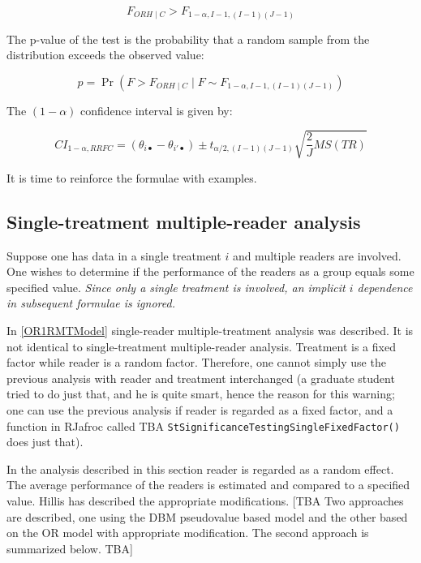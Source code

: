 \documentclass[
]{book}
\begin{document}
\[F_{ORH \mid C}>F_{1-\alpha,I-1,(I-1)(J-1)}\]

The p-value of the test is the probability that a random sample from the distribution exceeds the observed value:

\[p=\Pr(F>F_{ORH \mid C} \mid F \sim F_{1-\alpha,I-1,(I-1)(J-1)})\]

The \((1-\alpha)\) confidence interval is given by:

\begin{equation}
CI_{1-\alpha,RRFC}=(\theta_{i \bullet} - \theta_{i' \bullet}) \pm t_{\alpha/2, (I-1)(J-1)}\sqrt{\frac{2}{J}MS(TR)}
\label{eq:CIalphaRRFC}
\end{equation}

It is time to reinforce the formulae with examples.

\hypertarget{single-treatment-multiple-reader-analysis}{%
\subsection{Single-treatment multiple-reader analysis}\label{single-treatment-multiple-reader-analysis}}

Suppose one has data in a single treatment \(i\) and multiple readers are involved. One wishes to determine if the performance of the readers as a group equals some specified value. \emph{Since only a single treatment is involved, an implicit \(i\) dependence in subsequent formulae is ignored.}

In \ref{OR1RMTModel} single-reader multiple-treatment analysis was described. It is not identical to single-treatment multiple-reader analysis. Treatment is a fixed factor while reader is a random factor. Therefore, one cannot simply use the previous analysis with reader and treatment interchanged (a graduate student tried to do just that, and he is quite smart, hence the reason for this warning; one can use the previous analysis if reader is regarded as a fixed factor, and a function in RJafroc called TBA \texttt{StSignificanceTestingSingleFixedFactor()} does just that).

In the analysis described in this section reader is regarded as a random effect. The average performance of the readers is estimated and compared to a specified value. Hillis has described the appropriate modifications. {[}TBA Two approaches are described, one using the DBM pseudovalue based model and the other based on the OR model with appropriate modification. The second approach is summarized below. TBA{]}
\end{document}
